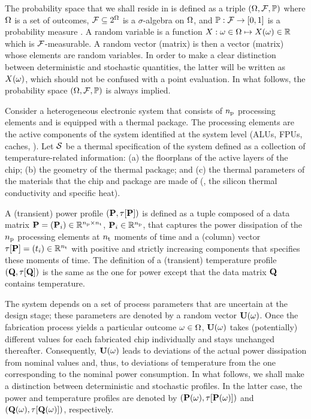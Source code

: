 
The probability space that we shall reside in is defined as a triple $(\Omega, \mathcal{F}, \mathbb{P})$ where $\Omega$ is a set of outcomes, $\mathcal{F} \subseteq 2^\Omega$ is a $\sigma$-algebra on $\Omega$, and $\mathbb{P}: \mathcal{F} \to [0, 1]$ is a probability measure \cite{xiu2010}.
A random variable is a function $X: \omega \in \Omega \mapsto X(\omega) \in \mathbb{R}$ which is $\mathcal{F}$-measurable.
A random vector (matrix) is then a vector (matrix) whose elements are random variables.
In order to make a clear distinction between deterministic and stochastic quantities, the latter will be written as $X(\omega)$, which should not be confused with a point evaluation.
In what follows, the probability space $(\Omega, \mathcal{F}, \mathbb{P})$ is always implied.

Consider a heterogeneous electronic system that consists of ${n_\text{p}}$ processing elements and is equipped with a thermal package.
The processing elements are the active components of the system identified at the system level (ALUs, FPUs, caches, \etc).
Let $\mathcal{S}$ be a thermal specification of the system defined as a collection of temperature-related information: (a) the floorplans of the active layers of the chip; (b) the geometry of the thermal package; and (c) the thermal parameters of the materials that the chip and package are made of (\eg, the silicon thermal conductivity and specific heat).

A (transient) power profile $\profileP$ is defined as a tuple composed of a data matrix $\mP = (\vP_i) \in \real^{\nprocs \times \nsteps}$, $\mathbf{P}_i \in \mathbb{R}^{n_\text{p}}$, that captures the power dissipation of the ${n_\text{p}}$ processing elements at ${n_\text{t}}$ moments of time and a (column) vector $\partition{\mP} = (\t_i) \in \real^{\nsteps}$ with positive and strictly increasing components that specifies these moments of time.
The definition of a (transient) temperature profile $\profileT$ is the same as the one for power except that the data matrix $\mTO$ contains temperature.

The system depends on a set of process parameters that are uncertain at the design stage; these parameters are denoted by a random vector $\mathbf{U}(\omega)$.
Once the fabrication process yields a particular outcome $\omega \in \Omega$, $\mathbf{U}(\omega)$ takes (potentially) different values for each fabricated chip individually and stays unchanged thereafter.
Consequently, $\mathbf{U}(\omega)$ leads to deviations of the actual power dissipation from nominal values and, thus, to deviations of temperature from the one corresponding to the nominal power consumption.
In what follows, we shall make a distinction between deterministic and stochastic profiles.
In the latter case, the power and temperature profiles are denoted by $\profileP{\o}$ and $\profileT{\o}$, respectively.

